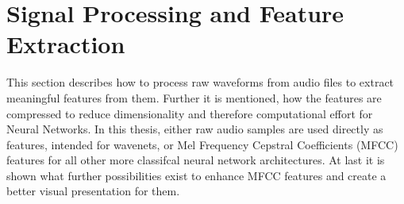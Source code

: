 
\chapter{Signal Processing and Feature Extraction}\label{sec:signal}
This section describes how to process raw waveforms from audio files to extract meaningful features from them.
Further it is mentioned, how the features are compressed to reduce dimensionality and therefore computational effort for Neural Networks.
In this thesis, either raw audio samples are used directly as features, intended for wavenets, or Mel Frequency Cepstral Coefficients (MFCC) features for all other more classifcal neural network architectures.
At last it is shown what further possibilities exist to enhance MFCC features and create a better visual presentation for them.




